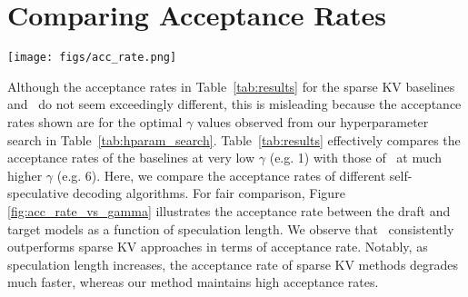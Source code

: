 \section{Comparing Acceptance Rates} \label{app:acc_rate}
\begin{figure*}[h]
    \centering
    \texttt{[image: figs/acc\_rate.png]}
    \caption{Acceptance rate of self-speculative decoding methods at different speculation length measured for model LWM-Text-Chat-128k on Multi-LexSum dataset.}
    \label{fig:acc_rate_vs_gamma}
\end{figure*}
Although the acceptance rates in Table~\ref{tab:results} for the sparse KV baselines and \OURS\ do not seem exceedingly different, this is misleading because the acceptance rates shown are for the optimal $\gamma$ values observed from our hyperparameter search in Table~\ref{tab:hparam_search}. Table~\ref{tab:results} effectively compares the acceptance rates of the baselines at very low $\gamma$ (e.g. 1) with those of \OURS\ at much higher $\gamma$ (e.g. 6). Here, we compare the acceptance rates of different self-speculative decoding algorithms. 
For fair comparison, Figure \ref{fig:acc_rate_vs_gamma} illustrates the acceptance rate between the draft and target models as a function of speculation length. We observe that \OURS\ consistently outperforms sparse KV approaches in terms of acceptance rate. Notably, as speculation length increases, the acceptance rate of sparse KV methods degrades much faster, whereas our method maintains high acceptance rates.



